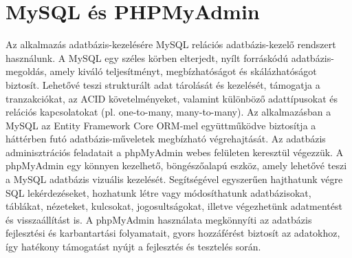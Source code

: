 \documentclass[colorlinks]{thesis-kando}
\theoremstyle{definition}
\theoremstyle{remark}
\begin{document}
\section{MySQL és PHPMyAdmin}
Az alkalmazás adatbázis-kezelésére MySQL relációs adatbázis-kezelő rendszert használunk. A MySQL egy széles körben elterjedt, nyílt forráskódú adatbázis-megoldás, amely kiváló teljesítményt, megbízhatóságot és skálázhatóságot biztosít. Lehetővé teszi strukturált adat tárolását és kezelését, támogatja a tranzakciókat, az ACID követelményeket, valamint különböző adattípusokat és relációs kapcsolatokat (pl. one-to-many, many-to-many). Az alkalmazásban a MySQL az Entity Framework Core ORM-mel együttműködve biztosítja a háttérben futó adatbázis-műveletek megbízható végrehajtását.
\newline
Az adatbázis adminisztrációs feladatait a phpMyAdmin webes felületen keresztül végezzük. A phpMyAdmin egy könnyen kezelhető, böngészőalapú eszköz, amely lehetővé teszi a MySQL adatbázis vizuális kezelését. Segítségével egyszerűen hajthatunk végre SQL lekérdezéseket, hozhatunk létre vagy módosíthatunk adatbázisokat, táblákat, nézeteket, kulcsokat, jogosultságokat, illetve végezhetünk adatmentést és visszaállítást is.
\newline
A phpMyAdmin használata megkönnyíti az adatbázis fejlesztési és karbantartási folyamatait, gyors hozzáférést biztosít az adatokhoz, így hatékony támogatást nyújt a fejlesztés és tesztelés során.
\end{document}
